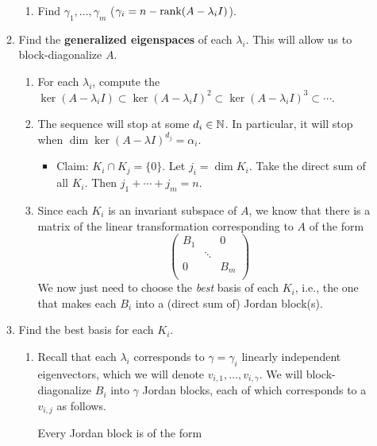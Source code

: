 \documentclass[../notes.tex]{subfiles}
\begin{document}
\begin{itemize}
\begin{enumerate}
\begin{enumerate}
            \item Find $\gamma_1,\dots,\gamma_m$ ($\gamma_i=n-\rank(A-\lambda_iI)$).
        \end{enumerate}
        \item Find the \textbf{generalized eigenspaces} of each $\lambda_i$. This will allow us to block-diagonalize $A$.
        \begin{enumerate}
            \item For each $\lambda_i$, compute the $\ker(A-\lambda_iI)\subset\ker(A-\lambda_iI)^2\subset\ker(A-\lambda_iI)^3\subset\cdots$.
            \item The sequence will stop at some $d_i\in\mathbb{N}$. In particular, it will stop when $\dim\ker(A-\lambda I)^{d_j}=\alpha_i$.
            \begin{itemize}
                \item Claim: $K_i\cap K_j=\{0\}$. Let $j_i=\dim K_i$. Take the direct sum of all $K_i$. Then $j_1+\cdots+j_m=n$.
            \end{itemize}
            \item Since each $K_i$ is an invariant subspace of $A$, we know that there is a matrix of the linear transformation corresponding to $A$ of the form
            \begin{equation*}
                \begin{pmatrix}
                    B_1 &  & 0\\
                     & \ddots & \\
                    0 &  & B_m\\
                \end{pmatrix}
            \end{equation*}
            We now just need to choose the \emph{best} basis of each $K_i$, i.e., the one that makes each $B_i$ into a (direct sum of) Jordan block(s).
        \end{enumerate}
        \item Find the best basis for each $K_i$.
        \begin{enumerate}
            \item Recall that each $\lambda_i$ corresponds to $\gamma=\gamma_i$ linearly independent eigenvectors, which we will denote $v_{i,1},\dots,v_{i,\gamma}$. We will block-diagonalize $B_i$ into $\gamma$ Jordan blocks, each of which corresponds to a $v_{i,j}$ as follows.\par
            Every Jordan block is of the form
            \begin{equation*}

\end{equation*}
\end{enumerate}
\end{enumerate}
\end{itemize}
\end{document}
